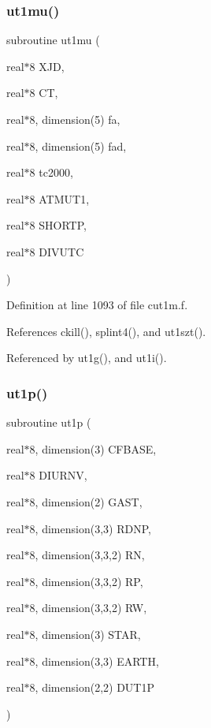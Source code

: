 \mbox{\label{cut1m_8f_abc7bd813d2132d56472aca4e187f3c2c}} 
\subsubsection{\texorpdfstring{ut1mu()}{ut1mu()}}
{\footnotesize\ttfamily subroutine ut1mu (\begin{DoxyParamCaption}\item[{real$\ast$8}]{X\+JD,  }\item[{real$\ast$8}]{CT,  }\item[{real$\ast$8, dimension(5)}]{fa,  }\item[{real$\ast$8, dimension(5)}]{fad,  }\item[{real$\ast$8}]{tc2000,  }\item[{real$\ast$8}]{A\+T\+M\+U\+T1,  }\item[{real$\ast$8}]{S\+H\+O\+R\+TP,  }\item[{real$\ast$8}]{D\+I\+V\+U\+TC }\end{DoxyParamCaption})}



Definition at line 1093 of file cut1m.\+f.



References ckill(), splint4(), and ut1szt().



Referenced by ut1g(), and ut1i().

\mbox{\label{cut1m_8f_a6a0332082e4f2034de0ed9c8ec336b00}} 
\subsubsection{\texorpdfstring{ut1p()}{ut1p()}}
{\footnotesize\ttfamily subroutine ut1p (\begin{DoxyParamCaption}\item[{real$\ast$8, dimension(3)}]{C\+F\+B\+A\+SE,  }\item[{real$\ast$8}]{D\+I\+U\+R\+NV,  }\item[{real$\ast$8, dimension(2)}]{G\+A\+ST,  }\item[{real$\ast$8, dimension(3,3)}]{R\+D\+NP,  }\item[{real$\ast$8, dimension(3,3,2)}]{RN,  }\item[{real$\ast$8, dimension(3,3,2)}]{RP,  }\item[{real$\ast$8, dimension(3,3,2)}]{RW,  }\item[{real$\ast$8, dimension(3)}]{S\+T\+AR,  }\item[{real$\ast$8, dimension(3,3)}]{E\+A\+R\+TH,  }\item[{real$\ast$8, dimension(2,2)}]{D\+U\+T1P }\end{DoxyParamCaption})}



